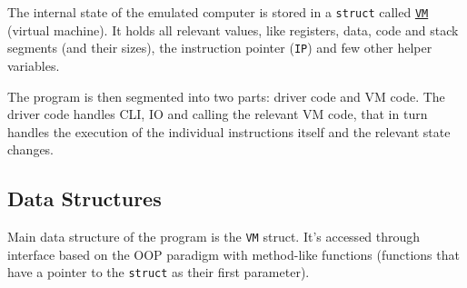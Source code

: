 \documentclass[12pt,a4paper]{paper}
\newcommand{\code}[1]{\texttt{#1}}
\begin{document}
The internal state of the emulated computer is stored in a \code{struct} called
\hyperlink{vm}{\code{VM}} (virtual machine). It holds all relevant values, like
registers, data, code and stack segments (and their sizes), the instruction
pointer (\code{IP}) and few other helper variables.

The program is then segmented into two parts: driver code and VM code. The driver
code handles CLI, IO and calling the relevant VM code, that in turn handles the
execution of the individual instructions itself and the relevant state changes. 

\subsection{Data Structures}

Main data structure of the program is the \hypertarget{vm}{\code{VM}} struct. It's accessed
through interface based on the OOP paradigm with method-like functions
(functions that have a pointer to the \code{struct} as their first parameter).

\begin{center}
\end{center}
\end{document}
